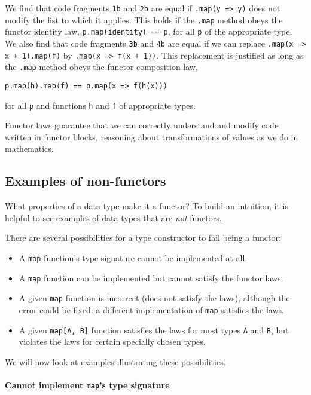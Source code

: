 We find that code fragments \lstinline!1b! and \lstinline!2b! are
equal if \lstinline!.map(y => y)! does not modify the list to which
it applies. This holds if the \lstinline!.map! method obeys the functor
identity law, \lstinline!p.map(identity) == p!, for all \lstinline!p!
of the appropriate type. We also find that code fragments \lstinline!3b!
and \lstinline!4b! are equal if we can replace \lstinline!.map(x => x + 1).map(f)!
by \lstinline!.map(x => f(x + 1))!. This replacement is justified
as long as the \lstinline!.map! method obeys the functor composition
law, 
\begin{lstlisting}
p.map(h).map(f) == p.map(x => f(h(x)))
\end{lstlisting}
for all \lstinline!p! and functions \lstinline!h! and \lstinline!f!
of appropriate types.

Functor laws guarantee that we can correctly understand and modify
code written in functor blocks, reasoning about transformations of
values as we do in mathematics.

\subsection{Examples of non-functors\label{subsec:Examples-of-non-functors}}

What properties of a data type make it a functor? To build an intuition,
it is helpful to see examples of data types that are \emph{not} functors.

There are several possibilities for a type constructor to fail being
a functor:
\begin{itemize}
\item A \lstinline!map! function's type signature cannot be implemented
at all.
\item A \lstinline!map! function can be implemented but cannot satisfy
the functor laws.
\item A given \lstinline!map! function is incorrect (does not satisfy the
laws), although the error could be fixed: a different implementation
of \lstinline!map! satisfies the laws.
\item A given \lstinline!map[A, B]! function satisfies the laws for most
types \lstinline!A! and \lstinline!B!, but violates the laws for
certain specially chosen types.
\end{itemize}
We will now look at examples illustrating these possibilities.

\paragraph{Cannot implement \lstinline!map!'s type signature}

